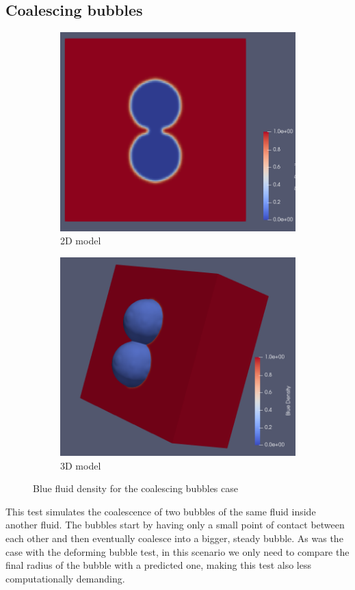 \documentclass[12pt]{book}
\begin{document}
\subsection{Coalescing bubbles}
\begin{figure}[H]
	\centering
	\begin{subfigure}{.49\textwidth}
		\includegraphics[width=\linewidth]{Resources/Images/coal.png}
		\caption{2D model}
	\end{subfigure}
	\begin{subfigure}{.49\textwidth}
		\includegraphics[width=\linewidth]{Resources/Images/coal3d.png}
		\caption{3D model}
	\end{subfigure} 
	\caption{Blue fluid density for the coalescing bubbles case}
	\label{fig:coalescence}
\end{figure} 
This test simulates the coalescence of two bubbles of the same fluid inside another fluid. The bubbles start by having only a small point of contact between each other and then eventually coalesce into a bigger, steady bubble. As was the case with the deforming bubble test, in this scenario we only need to compare the final radius of the bubble with a predicted one, making this test also less computationally demanding. 
\end{document}
